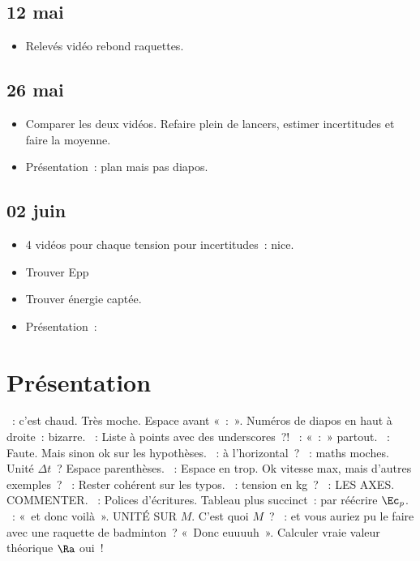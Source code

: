 \documentclass[a4paper, 11pt, final, garamond]{book}
\begin{document}
\subsection{12 mai}
\begin{itemize}
  \item Relevés vidéo rebond raquettes.
\end{itemize}

\subsection{26 mai}
\begin{itemize}
  \item Comparer les deux vidéos. Refaire plein de lancers, estimer incertitudes
    et faire la moyenne.
  \item Présentation~: plan mais pas diapos.
\end{itemize}

\subsection{02 juin}
\begin{itemize}
  \item 4 vidéos pour chaque tension pour incertitudes~: nice.
  \item Trouver Epp
  \item Trouver énergie captée.
  \item Présentation~: 
\end{itemize}

\section{Présentation}

\begin{itemize}
  ~: c'est chaud. Très moche. Espace avant «~:~». Numéros de
  diapos en haut à droite~: bizarre.
  ~: Liste à points avec des underscores~?!
  ~: «~:~» partout.
  ~: Faute. Mais sinon ok sur les hypothèses.
  ~: à l'horizontal~?
  ~: maths moches. Unité $\Delta{t}$~? Espace parenthèses.
  ~: Espace en trop. Ok vitesse max, mais d'autres exemples~?
  ~: Rester cohérent sur les typos.
  ~: tension en \si{kg}~?
  ~: LES AXES. COMMENTER.
  ~: Polices d'écritures. Tableau plus succinct~: par réécrire
  $\Ec_p$.
  ~: «~et donc voilà~». UNITÉ SUR $M$. C'est quoi $M$~?
  ~: et vous auriez pu le faire avec une raquette de badminton~?
  «~Donc euuuuh~». Calculer vraie valeur théorique $\Ra $ oui~!
\end{itemize}
\end{document}
